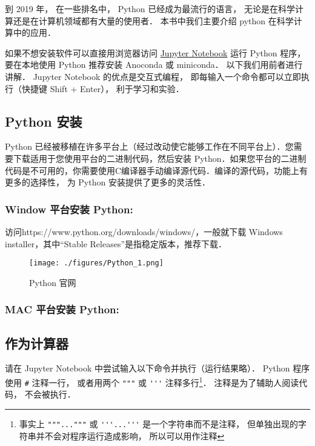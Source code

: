 
到 2019 年， 在一些排名中， Python 已经成为最流行的语言， 无论是在科学计算还是在计算机领域都有大量的使用者． 本书中我们主要介绍 python 在科学计算中的应用．

如果不想安装软件可以直接用浏览器访问 \href{https://jupyter.org/}{Jupyter Notebook} 运行 Python 程序， 要在本地使用 Python 推荐安装 Anoconda 或 miniconda． 以下我们用前者进行讲解． Jupyter Notebook 的优点是交互式编程， 即每输入一个命令都可以立即执行（快捷键 Shift + Enter）， 利于学习和实验．

\subsection{Python 安装}
Python 已经被移植在许多平台上（经过改动使它能够工作在不同平台上）．您需要下载适用于您使用平台的二进制代码，然后安装 Python．如果您平台的二进制代码是不可用的，你需要使用C编译器手动编译源代码．编译的源代码，功能上有更多的选择性， 为 Python 安装提供了更多的灵活性．

\subsubsection{Window 平台安装 Python:}
访问https://www.python.org/downloads/windows/，一般就下载  Windows installer，其中“Stable Releases”是指稳定版本，推荐下载．
\begin{figure}[ht]
\centering
\texttt{[image: ./figures/Python\_1.png]}
\caption{Python 官网} \label{Python_fig1}
\end{figure}

\subsubsection{MAC 平台安装 Python:}

\subsection{作为计算器}
请在 Jupyter Notebook 中尝试输入以下命令并执行（运行结果略）． Python 程序使用 \verb|#| 注释一行，  或者用两个 \verb|"""| 或 \verb|'''| 注释多行\footnote{事实上 \lstinline|"""..."""| 或 \lstinline|'''...'''| 是一个字符串而不是注释， 但单独出现的字符串并不会对程序运行造成影响， 所以可以用作注释}． 注释是为了辅助人阅读代码， 不会被执行．

